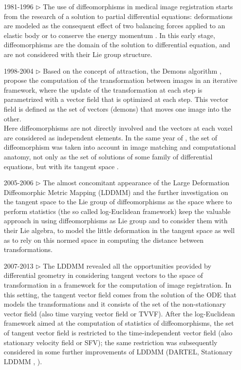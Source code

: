 \begin{enumerate}
	\item[1981-1996 $\triangleright$] The use of diffeomorphisms in medical image registration starts from the research of a solution to partial differential equations: deformations are modeled as the consequent effect of two balancing forces applied to an elastic body \cite{Broit:1981} or to conserve the energy momentum \cite{christensen1996deformable}. In this early stage, diffeomorphisms are the domain of the solution to differential equation, and are not considered with their Lie group structure.
	\item[1998-2004 $\triangleright$] Based on the concept of attraction, the Demons algorithm \cite{thirion1998image}, \cite{pennec1999understanding} propose the computation of the transformation between images in an iterative framework, where the update of the transformation at each step is parametrized with a vector field that is optimized at each step. This vector field is defined as the set of vectors (demons) that moves one image into the other. \\
	Here diffeomorphisms are not directly involved and the vectors at each voxel are considered as independent elements. 
	In the same year of \cite{thirion1998image}, the set of diffeomorphism was taken into account in image matching and computational anatomy, not only as the set of solutions of some family of differential equations, but with its tangent space \cite{Dupuis:98:variationalproblems,  trouve1998diffeomorphisms, grenander1998computational}.
	\item[2005-2006 $\triangleright$] The almost concomitant appearance of the Large Deformation Diffeomorphic Metric Mapping (LDDMM) \cite{beg2005computing} and the further investigation on the tangent space to the Lie group of diffeomorphisms as the space where to perform statistics (the so called log-Euclidean framework) \cite{arsigny2006statistics, Arsigny:MRM:06} keep the valuable approach in using diffeomorphisms as Lie group and to consider them with their Lie algebra, to model the little deformation in the tangent space as well as to rely on this normed space in computing the distance between transformations.
	\item[2007-2013 $\triangleright$] The LDDMM revealed all the opportunities provided by differential geometry in considering tangent vectors to the space of transformation in a framework for the computation of image registration. In this setting, the tangent vector field comes from the solution of the ODE that models the transformations and it consists of the set of the non-stationary vector field (also time varying vector field or TVVF). After the log-Euclidean framework \cite{arsigny2006statistics} aimed at the computation of statistics of diffeomorphisms, the set of tangent vector field is restricted to the time-independent vector field (also stationary velocity field or SFV); the same restriction was subsequently considered in some further improvements of LDDMM (DARTEL, Stationary LDDMM \cite{Ashburner:07}, \cite{hernandez2007registration}). 

\end{enumerate}
